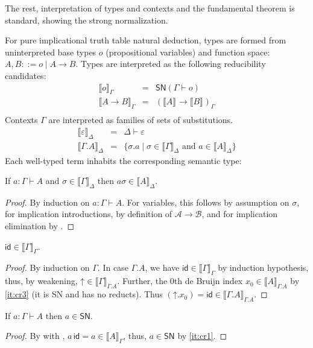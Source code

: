\documentclass[a4paper,USenglish,cleveref, autoref, thm-restate]{lipics-v2019}
\newcommand{\den}[2][]{\llbracket#2\rrbracket^{#1}}
\newcommand{\tid}{\mathsf{id}}
\newcommand{\Den}[2]{\den{#1}_{#2}}
\newcommand{\Ge}{\ensuremath{\varepsilon}}
\newcommand{\Gs}{\ensuremath{\sigma}}
\newcommand{\A}{\mathcal{A}}
\newcommand{\B}{\mathcal{B}}
\newcommand{\SN}{\mathsf{SN}}
\newcommand{\up}{\mathord{\uparrow}}
\begin{document}
The rest, interpretation of types and contexts and the fundamental
theorem is standard, showing the strong normalization.

For pure implicational truth table natural deduction, types are formed
from uninterpreted base types $o$ (propositional variables) and
function space: $A,B ::= o \mid A \to B$.  Types are interpreted as
the following reducibility candidates:
\[
\begin{array}{lll}
  \Den o \Gamma & = & \SN(\Gamma \vdash o) \\
  \Den{A \to B} \Gamma & = & (\den A \to \den B)_\Gamma \\
\end{array}
\]
Contexts $\Gamma$ are interpreted as families of sets of
substitutions.
\[
  \begin{array}{lll}
\Den \Ge \Delta & = & \Delta \vdash \Ge \\
\Den{\Gamma.A} \Delta & = & \{ \Gs.a \mid \Gs \in \Den \Gamma \Delta
                            \mbox{ and } a \in \Den A \Delta \}
  \end{array}
\]
Each well-typed term inhabits the corresponding semantic type:
\begin{theorem}
  \label{thm:fund}
  If $a : \Gamma \vdash A$ and $\Gs \in \Den \Gamma \Delta$ then $a
  \sigma \in \Den A \Delta$.
\end{theorem}
\begin{proof}
  By induction on $a : \Gamma \vdash A$.
  For variables, this follows by assumption on $\Gs$, for implication
  introductions, by definition of $\A \to \B$, and for implication
  elimination by .
\end{proof}

\begin{lemma}
  \label{lem:id}
  $\tid \in \Den \Gamma \Gamma$.
\end{lemma}
\begin{proof}
  By induction on $\Gamma$.  In case $\Gamma.A$, we have
  $\tid \in \Den \Gamma \Gamma$ by induction hypothesis, thus, by
  weakening, ${\up} \in \Den\Gamma{\Gamma.A}$.  Further, the 0th de
  Bruijn index $x_0 \in \Den A {\Gamma.A}$ by \ref{it:cr3} (it is SN and has no
  reducts).  Thus $(\up.x_0) = \tid \in \Den{\Gamma.A}{\Gamma.A}$.
\end{proof}

\begin{corollary}
  If $a : \Gamma \vdash A$ then $a \in \SN$.
\end{corollary}
\begin{proof}
  By  with , $a\, \tid = a \in \Den A
  \Gamma$, thus, $a \in \SN$ by \ref{it:cr1}.
\end{proof}
\end{document}
